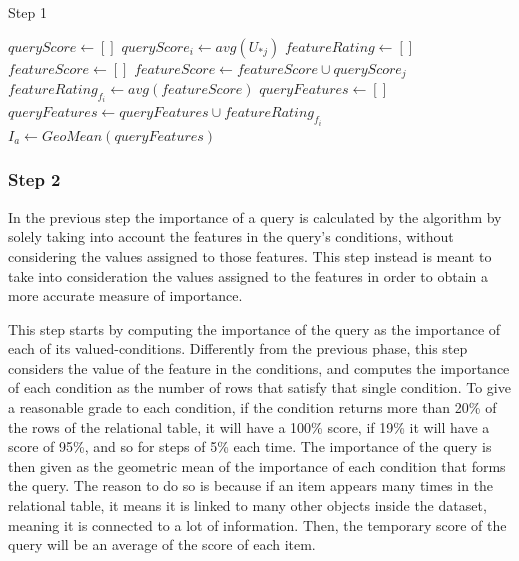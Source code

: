 \begin{algorithm}[h]
    \caption{Step 1} 
    \begin{algorithmic}[1]
        \State $queryScore \gets []$
            \State $queryScore_i \gets avg(U_{*j})$
        \EndFor
        \State
        \State $featureRating \gets []$
         
            \State $featureScore \gets []$
                    \State $featureScore \gets featureScore \cup queryScore_j$
                \EndIf
            \EndFor
            \State $featureRating_{f_i} \gets avg(featureScore)$
        \EndFor 
        \State
        \State $queryFeatures \gets []$
         
                \State $queryFeatures \gets queryFeatures \cup featureRating_{f_i}$
            \EndIf
        \EndFor
        \State $I_a \gets GeoMean(queryFeatures)$
    
    \end{algorithmic} 
    \label{alg:PartB_Step1}
\end{algorithm}


\subsubsection{Step 2}
In the previous step the importance of a query is calculated by the algorithm by solely taking into account the features in the query's conditions, without considering the values assigned to those features. This step instead is meant to take into consideration the values assigned to the features in order to obtain a more accurate measure of importance.

This step starts by computing the importance of the query as the importance of each of its valued-conditions. Differently from the previous phase, this step considers the value of the feature in the conditions, and computes the importance of each condition as the number of rows that satisfy that single condition. To give a reasonable grade to each condition, if the condition returns more than 20\% of the rows of the relational table, it will have a 100\% score, if 19\% it will have a score of 95\%, and so for steps of 5\% each time. The importance of the query is then given as the geometric mean of the importance of each condition that forms the query. The reason to do so is because if an item appears many times in the relational table, it means it is linked to many other objects inside the dataset, meaning it is connected to a lot of information. Then, the temporary score of the query will be an average of the score of each item.




